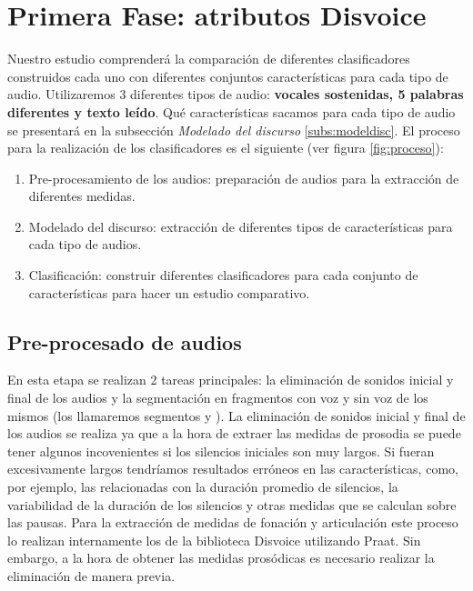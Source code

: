 \section{Primera Fase: atributos Disvoice}
Nuestro estudio comprenderá la comparación de diferentes clasificadores construidos cada uno con diferentes conjuntos características para cada tipo de audio. Utilizaremos 3 diferentes tipos de audio: \textbf{vocales sostenidas, 5 palabras diferentes y texto leído}. Qué características sacamos para cada tipo de audio se presentará en la subsección \textit{Modelado del discurso} \ref{subs:modeldisc}. El proceso para la realización de los clasificadores es el siguiente (ver figura \ref{fig:proceso}):
\begin{enumerate}
\item Pre-procesamiento de los audios: preparación de audios para la extracción de diferentes medidas.
\item Modelado del discurso: extracción de diferentes tipos de características para cada tipo de audios.
\item Clasificación: construir diferentes clasificadores para cada conjunto de características para hacer un estudio comparativo.
\end{enumerate}


\subsection{Pre-procesado de audios}
En esta etapa se realizan 2 tareas principales: la eliminación de sonidos inicial y final de los audios y la segmentación en fragmentos con voz y sin voz de los mismos (los llamaremos segmentos  y ).
La eliminación de sonidos inicial y final de los audios se realiza ya que a la hora de extraer las medidas de prosodia se puede tener algunos incovenientes si los silencios iniciales son muy largos. Si fueran excesivamente largos tendríamos resultados erróneos en las características, como, por ejemplo, las relacionadas con la duración promedio de silencios, la variabilidad de la duración de los silencios y otras medidas que se calculan sobre las pausas.
Para la extracción de medidas de fonación y articulación este proceso lo realizan internamente los  de la biblioteca Disvoice \cite{neurospeech} utilizando Praat. Sin embargo, a la hora de obtener las medidas prosódicas es necesario realizar la eliminación de manera previa.

